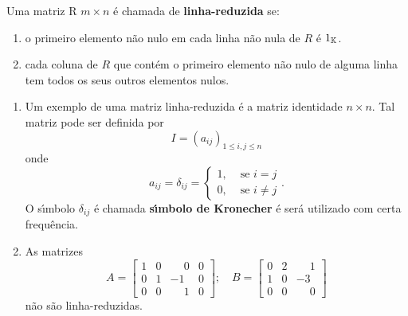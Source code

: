 \begin{definicao}\label{linhareduzida}
Uma matriz R $m \times n$ \'e chamada de \textbf{linha-reduzida} se:
\begin{enumerate}[label=({\roman*})]
\item o primeiro elemento n\~ao nulo em cada linha n\~ao nula de $R$ \'e $1_{\mathbb{K}}$.
\item cada coluna de $R$ que cont\'em o primeiro elemento n\~ao nulo de alguma linha tem todos os seus outros elementos nulos.
\end{enumerate}
\end{definicao}

\begin{exemplo}
\begin{enumerate}
	\item Um exemplo de uma matriz linha-reduzida \'e a matriz identidade $n \times n$. Tal matriz pode ser definida por
	\[
	I = (a_{ij})_{1 \le i,j \le n}
	\]
	onde
	\[
	a_{ij} = \delta_{ij} = \begin{cases}
	1, & \mbox{ se } i = j\\
	0, & \mbox{ se } i \ne j 
	\end{cases}.
	\]
	O s{\'\i}mbolo $\delta_{ij}$ \'e chamada \textbf{s{\'\i}mbolo de Kronecher} \'e ser\'a utilizado com certa frequ\^encia.
	\item As matrizes
	\[
	A = \begin{bmatrix}
	1 & 0 & \phantom{-}0 & 0\\
	0 & 1 & -1 & 0\\
	0 & 0 & \phantom{-}1 & 0
	\end{bmatrix}; \quad B = \begin{bmatrix}
	0 & 2 & \phantom{-}1\\
	1 & 0 & -3\\
	0 & 0 & \phantom{-}0
	\end{bmatrix}
	\]
	n\~ao s\~ao linha-reduzidas.
\end{enumerate}
\end{exemplo}

